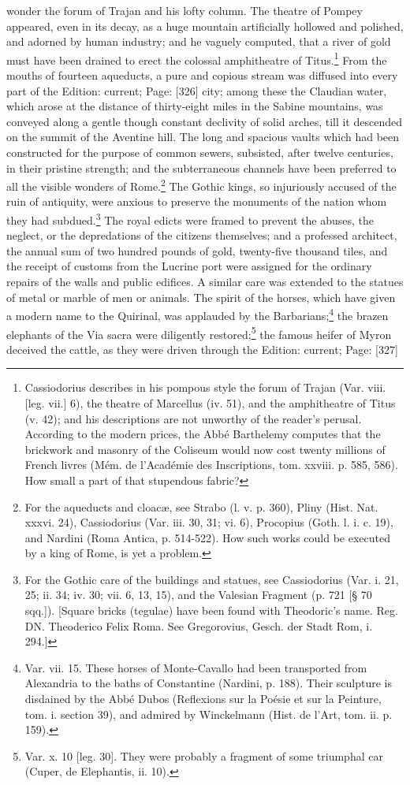 wonder the forum of Trajan and his lofty column. The theatre of Pompey appeared, even in its decay, as a huge mountain artificially hollowed and polished, and adorned by human industry; and he vaguely computed, that a river of gold must have been drained to erect the colossal amphitheatre of Titus.\footnote{Cassiodorius describes in his pompous style the forum of Trajan (Var. viii. [leg. vii.] 6), the theatre of Marcellus (iv. 51), and the amphitheatre of Titus (v. 42); and his descriptions are not unworthy of the reader\texthebrew{}’s perusal. According to the modern prices, the Abbé Barthelemy computes that the brickwork and masonry of the Coliseum would now cost twenty millions of French livres (Mém. de l\texthebrew{}’Académie des Inscriptions, tom. xxviii. p. 585, 586). How small a part of that stupendous fabric?} From the mouths of fourteen aqueducts, a pure and copious stream was diffused into every part of the Edition: current; Page: [326] city; among these the Claudian water, which arose at the distance of thirty-eight miles in the Sabine mountains, was conveyed along a gentle though constant declivity of solid arches, till it descended on the summit of the Aventine hill. The long and spacious vaults which had been constructed for the purpose of common sewers, subsisted, after twelve centuries, in their pristine strength; and the subterraneous channels have been preferred to all the visible wonders of Rome.\footnote{For the aqueducts and cloacæ, see Strabo (l. v. p. 360), Pliny (Hist. Nat. xxxvi. 24), Cassiodorius (Var. iii. 30, 31; vi. 6), Procopius (Goth. l. i. c. 19), and Nardini (Roma Antica, p. 514-522). How such works could be executed by a king of Rome, is yet a problem.} The Gothic kings, so injuriously accused of the ruin of antiquity, were anxious to preserve the monuments of the nation whom they had subdued.\footnote{For the Gothic care of the buildings and statues, see Cassiodorius (Var. i. 21, 25; ii. 34; iv. 30; vii. 6, 13, 15), and the Valesian Fragment (p. 721 [§ 70 sqq.]). [Square bricks (tegulae) have been found with Theodoric\texthebrew{}’s name. Reg. DN. Theoderico Felix Roma. See Gregorovius, Gesch. der Stadt Rom, i. 294.]} The royal edicts were framed to prevent the abuses, the neglect, or the depredations of the citizens themselves; and a professed architect, the annual sum of two hundred pounds of gold, twenty-five thousand tiles, and the receipt of customs from the Lucrine port were assigned for the ordinary repairs of the walls and public edifices. A similar care was extended to the statues of metal or marble of men or animals. The spirit of the horses, which have given a modern name to the Quirinal, was applauded by the Barbarians;\footnote{Var. vii. 15. These horses of Monte-Cavallo had been transported from Alexandria to the baths of Constantine (Nardini, p. 188). Their sculpture is disdained by the Abbé Dubos (Reflexions sur la Poésie et sur la Peinture, tom. i. section 39), and admired by Winckelmann (Hist. de l\texthebrew{}’Art, tom. ii. p. 159).} the brazen elephants of the Via sacra were diligently restored;\footnote{Var. x. 10 [leg. 30]. They were probably a fragment of some triumphal car (Cuper, de Elephantis, ii. 10).} the famous heifer of Myron deceived the cattle, as they were driven through the Edition: current; Page: [327] 